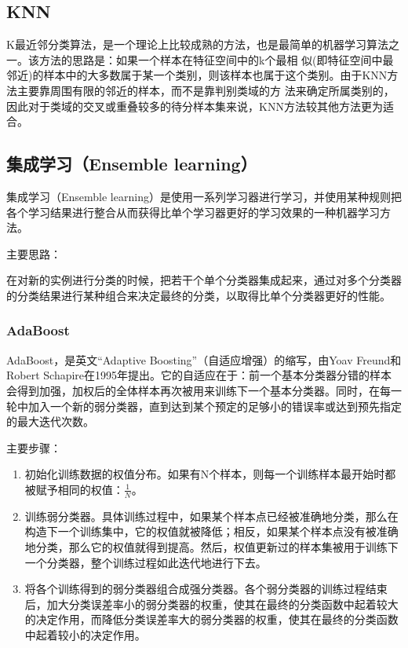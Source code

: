 \documentclass[12pt]{article}
\begin{document}
\subsection{KNN}

K最近邻分类算法，是一个理论上比较成熟的方法，也是最简单的机器学习算法之一。该方法的思路是：如果一个样本在特征空间中的k个最相 似(即特征空间中最邻近)的样本中的大多数属于某一个类别，则该样本也属于这个类别。由于KNN方法主要靠周围有限的邻近的样本，而不是靠判别类域的方 法来确定所属类别的，因此对于类域的交叉或重叠较多的待分样本集来说，KNN方法较其他方法更为适合。

\subsection{集成学习（Ensemble learning）}

集成学习（Ensemble learning）是使用一系列学习器进行学习，并使用某种规则把各个学习结果进行整合从而获得比单个学习器更好的学习效果的一种机器学习方法。

{\color{blue}主要思路}：

在对新的实例进行分类的时候，把若干个单个分类器集成起来，通过对多个分类器的分类结果进行某种组合来决定最终的分类，以取得比单个分类器更好的性能。

\subsubsection{AdaBoost}

AdaBoost，是英文``Adaptive Boosting''（自适应增强）的缩写，由Yoav Freund和Robert Schapire在1995年提出。它的自适应在于：前一个基本分类器分错的样本会得到加强，加权后的全体样本再次被用来训练下一个基本分类器。同时，在每一轮中加入一个新的弱分类器，直到达到某个预定的足够小的错误率或达到预先指定的最大迭代次数。

{\color{blue}主要步骤}：
\begin{enumerate}
    \item 初始化训练数据的权值分布。如果有N个样本，则每一个训练样本最开始时都被赋予相同的权值：$\frac{1}{N}$。
    \item 训练弱分类器。具体训练过程中，如果某个样本点已经被准确地分类，那么在构造下一个训练集中，它的权值就被降低；相反，如果某个样本点没有被准确地分类，那么它的权值就得到提高。然后，权值更新过的样本集被用于训练下一个分类器，整个训练过程如此迭代地进行下去。
    \item 将各个训练得到的弱分类器组合成强分类器。各个弱分类器的训练过程结束后，加大分类误差率小的弱分类器的权重，使其在最终的分类函数中起着较大的决定作用，而降低分类误差率大的弱分类器的权重，使其在最终的分类函数中起着较小的决定作用。
\end{enumerate}
\end{document}

